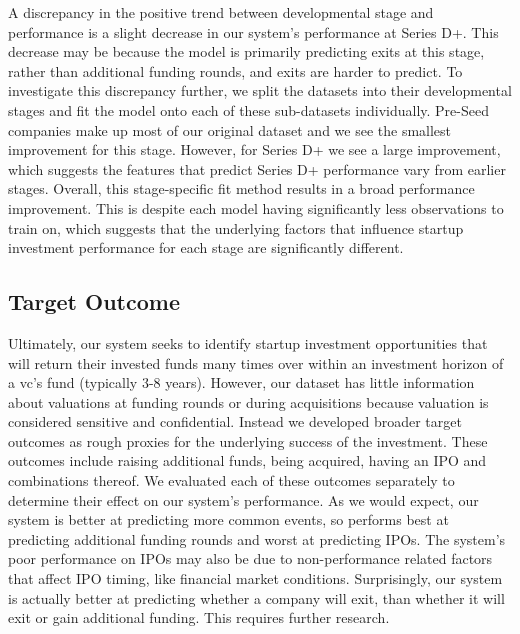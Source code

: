 \documentclass[../thesis/thesis.tex]{subfiles}
\begin{document}
A discrepancy in the positive trend between developmental stage and performance is a slight decrease in our system's performance at Series D+. This decrease may be because the model is primarily predicting exits at this stage, rather than additional funding rounds, and exits are harder to predict. To investigate this discrepancy further, we split the datasets into their developmental stages and fit the model onto each of these sub-datasets individually. Pre-Seed companies make up most of our original dataset and we see the smallest improvement for this stage. However, for Series D+ we see a large improvement, which suggests the features that predict Series D+ performance vary from earlier stages. Overall, this stage-specific fit method results in a broad performance improvement. This is despite each model having significantly less observations to train on, which suggests that the underlying factors that influence startup investment performance for each stage are significantly different.

\subsection{Target Outcome}

Ultimately, our system seeks to identify startup investment opportunities that will return their invested funds many times over within an investment horizon of a \gls{vc}'s fund (typically 3-8 years). However, our dataset has little information about valuations at funding rounds or during acquisitions because valuation is considered sensitive and confidential. Instead we developed broader target outcomes as rough proxies for the underlying success of the investment. These outcomes include raising additional funds, being acquired, having an IPO and combinations thereof. We evaluated each of these outcomes separately to determine their effect on our system's performance. As we would expect, our system is better at predicting more common events, so performs best at predicting additional funding rounds and worst at predicting IPOs. The system's poor performance on IPOs may also be due to non-performance related factors that affect IPO timing, like financial market conditions. Surprisingly, our system is actually better at predicting whether a company will exit, than whether it will exit or gain additional funding. This requires further research.
\end{document}
